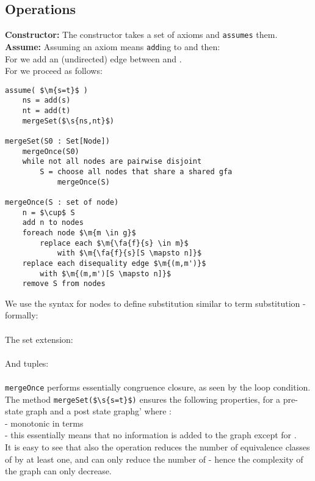 \subsection{Operations}
\textbf{Constructor:} The constructor takes a set of axioms and \lstinline{assumes} them.\\
\textbf{Assume:} Assuming an axiom  means \lstinline{add}ing  to  and then:\\
For  we add an (undirected) edge between  and . \\
For  we proceed as follows:
\begin{lstlisting}
assume( $\m{s=t}$ )
	ns = add(s)
	nt = add(t)
	mergeSet($\s{ns,nt}$)
	
mergeSet(S0 : Set[Node])
	mergeOnce(S0)
	while not all nodes are pairwise disjoint
		S = choose all nodes that share a shared gfa
			mergeOnce(S)
	
mergeOnce(S : set of node)
	n = $\cup$ S 
	add n to nodes
	foreach node $\m{m \in g}$
		replace each $\m{\fa{f}{s} \in m}$
			with $\m{\fa{f}{s}[S \mapsto n]}$
	replace each disequality edge $\m{(m,m')}$
		with $\m{(m,m')[S \mapsto n]}$
	remove S from nodes
\end{lstlisting}
We use the syntax 
for nodes  to define substitution similar to term substitution - formally:\\
\\
The set extension:\\
\\
And tuples:\\
\\
\lstinline{mergeOnce} performs essentially congruence closure, as seen by the loop condition.\\
The method \lstinline|mergeSet($\s{s=t}$)| ensures the following properties, for a pre-state graph  and a post state graph{g'} where :\\
 - monotonic in terms\\
 - this essentially means that no information is added to the graph except for .\\
It is easy to see that also the operation reduces the number of equivalence classes of  by at least one, and can only reduce the number of \GFAs{} - hence the complexity of the graph can only decrease.\\
